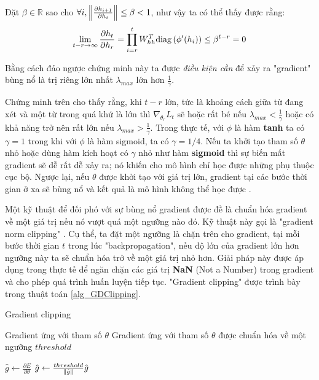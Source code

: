 Đặt $\beta \in \mathbb{R}$ sao cho $\forall i, \left\lVert\frac{\partial h_{i+1}}{\partial h_{i}}\right\rVert \leq \beta < 1$, như vậy ta có thể thấy được rằng:
\begin{equation} \label{gradientVanish3}
\lim_{t - r \to \infty} \frac{\partial h_{t}}{\partial h_r} = \prod_{i=r}^{t} W_{hh}^T \mathrm{diag} \left(\phi'(h_i) \right) \leq \beta^{t - r} = 0
\end{equation}

Bằng cách đảo ngược chứng minh này ta được \textit{điều kiện cần} để xảy ra "gradient" bùng nổ là trị riêng lớn nhất $\lambda_{max}$ lớn hơn $\frac{1}{\gamma}$.

Chứng minh trên cho thấy rằng, khi $t-r$ lớn, tức là khoảng cách giữa từ đang xét và một từ trong quá khứ là lớn thì $\nabla_{\theta_r} L_t$ sẽ hoặc rất bé nếu $\lambda_{max} < \frac{1}{\gamma}$ hoặc có khả năng trở nên rất lớn nếu $\lambda_{max} > \frac{1}{\gamma}$. Trong thực tế, với $\phi$ là hàm \textbf{tanh} ta có $\gamma = 1$ trong khi với $\phi$ là hàm sigmoid, ta có $\gamma = 1/4$. Nếu ta khởi tạo tham số $\theta$ nhỏ hoặc dùng hàm kích hoạt có $\gamma$ nhỏ như hàm \textbf{sigmoid} thì sự biến mất gradient sẽ dễ rất dễ xảy ra; nó khiến cho mô hình chỉ học được những phụ thuộc cục bộ. Ngược lại, nếu $\theta$ được khởi tạo với giá trị lớn, gradient tại các bước thời gian ở xa sẽ bùng nổ và kết quả là mô hình không thể học được \cite{pascanu2011}.

Một kỹ thuật để đối phó với sự bùng nổ gradient được đề là chuẩn hóa gradient về một giá trị nếu nó vượt quá một ngưỡng nào đó. Kỹ thuật này gọi là "gradient norm clipping" \cite{pascanu2012}. Cụ thể, ta đặt một ngưỡng là chặn trên cho gradient, tại mỗi bước thời gian $t$ trong lúc "backpropagation", nếu độ lớn của gradient lớn hơn ngưỡng này ta sẽ chuẩn hóa trở về một giá trị nhỏ hơn. Giải pháp này được áp dụng trong thực tế để ngăn chặn các giá trị \textbf{NaN} (Not a Number) trong gradient và cho phép quá trình huấn luyện tiếp tục. "Gradient clipping" được trình bày trong thuật toán \ref{alg_GDClipping}.

\begin{algorithm}
	\caption{Gradient clipping}
	\label{alg_GDClipping}
	\begin{algorithmic}[1]
		\renewcommand{\algorithmicrequire}{\textbf{Đầu vào:}}
		\renewcommand{\algorithmicensure}{\textbf{Đầu ra:}}
		\algnewcommand{}
		\algnewcommand\Operation{\item[\algorithmicoperation]}
		
		\Require Gradient ứng với tham số $\theta$
		\Ensure Gradient ứng với tham số $\theta$ được chuẩn hóa về một ngưỡng $threshold$
		
		\Operation
		\State $\hat{g} \leftarrow \frac{\partial E}{\partial \theta}$
		\State $\hat{g} \leftarrow \frac{threshold}{\left\lVert\hat{g}\right\rVert} \hat{g}$
		\EndIf
	\end{algorithmic}
\end{algorithm}

